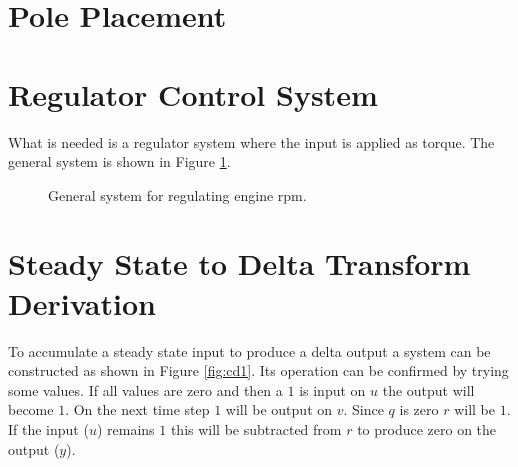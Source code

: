 \documentclass{article}
\begin{document}
\clearpage

\section{Pole Placement}


\clearpage
\section{Regulator Control System}

What is needed is a regulator system where the input is applied
as torque.
The general system is shown in Figure \ref{fig:rpm1}.

\begin{figure}[hbp!]
\begin{center}


\end{center}
\caption{General system for regulating engine rpm.}\label{fig:rpm1}
\end{figure}


\clearpage
\printbibliography[heading=bibintoc]

\clearpage
\appendix

\clearpage
\section{Steady State to Delta Transform Derivation}
\label{app:cdelta}

To accumulate a steady state input to produce a delta output
a system can be constructed as shown in Figure \ref{fig:cd1}.
Its operation can be confirmed by trying some values.
If all values are zero and then a $1$ is input on $u$ the
output will become $1$.
On the next time step $1$ will be output on $v$.
Since $q$ is zero $r$ will be $1$.
If the input ($u$) remains $1$ this will be subtracted from $r$
to produce zero on the output ($y$).
\end{document}
